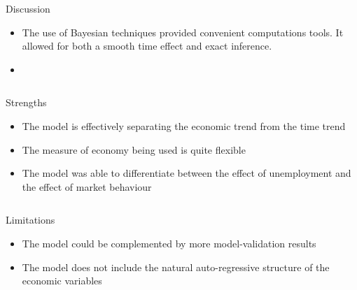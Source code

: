 \documentclass[final]{beamer}
\newcounter{acolumn}%
\def\autoheight{\vspace*{0pt}}%
\begin{document}
\begin{frame}
\begin{acolumns}[t]
        \begin{column}{.24\linewidth}
        		
                 
                 \begin{block}{Discussion}
                 	\begin{itemize}
                 		\item The use of Bayesian techniques provided convenient computations tools. It allowed for both a smooth time effect and exact inference.
                 		\item                  		
                 	\end{itemize}
                  \autoheight   
                 \end{block}
                              
        \end{column}
        
        \begin{column}{.24\linewidth}
		
         
         \begin{block}{Strengths}
         	\begin{itemize}
         		\item The model is effectively separating the economic trend from the time trend
         		\item The measure of economy being used is quite flexible
         		\item The model was able to differentiate between the effect of unemployment and the effect of market behaviour
         	\end{itemize}
          \autoheight   
         \end{block}
                      
        \end{column}
                  
        
        \begin{column}{.24\linewidth}
         
         \begin{block}{Limitations}
         	\begin{itemize}
         		\item The model could be complemented by more model-validation results
         		\item The model does not include the natural auto-regressive structure of the economic variables
         	\end{itemize}
          \autoheight   
         \end{block}
                      

\end{column}
\end{acolumns}
\end{frame}
\end{document}
